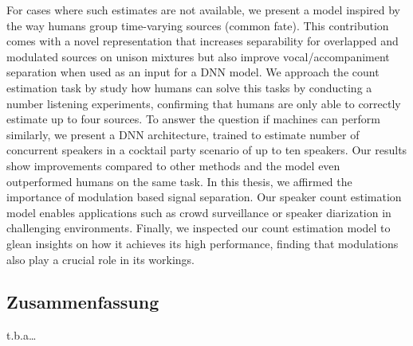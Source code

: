 For cases where such estimates are not available, we present a model inspired by the way humans group time-varying sources (common fate).
This contribution comes with a novel representation that increases separability for overlapped and modulated sources on unison mixtures but also improve vocal/accompaniment separation when used as an input for a DNN model.
We approach the count estimation task by study how humans can solve this tasks by conducting a number listening experiments, confirming that humans are only able to correctly estimate up to four sources.
To answer the question if machines can perform similarly, we present a DNN architecture, trained to estimate number of concurrent speakers in a cocktail party scenario of up to ten speakers.
Our results show improvements compared to other methods and the model even outperformed humans on the same task.
In this thesis, we affirmed the importance of modulation based signal separation. 
Our speaker count estimation model enables applications such as crowd surveillance or speaker diarization in challenging environments.
Finally, we inspected our count estimation model to glean insights on how it achieves its high performance, finding that modulations also play a crucial role in its workings.

\vfill

\begin{otherlanguage}{ngerman}
\chapter*{Zusammenfassung}
t.b.a\dots
\end{otherlanguage}

\endgroup

\vfill
